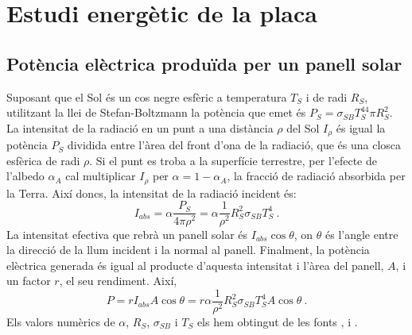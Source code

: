 \documentclass[11pt]{article}
\begin{document}
\section{Estudi energètic de la placa}
\subsection{Potència elèctrica produïda per un panell solar}
Suposant que el Sol és un cos negre esfèric a temperatura $T_S$ i de radi $R_S$, utilitzant la llei de Stefan-Boltzmann la potència que emet és $P_S=\sigma_{SB}T_S^44\pi R_S^2$. La intensitat de la radiació en un punt a una distància ${\rho}$ del Sol $I_{\rho}$ és igual la potència $P_S$ dividida entre l'àrea del front d'ona de la radiació, que és una closca esfèrica de radi ${\rho}$. Si el punt es troba a la superfície terrestre,  per l’efecte de l’albedo $\alpha_A$ cal multiplicar $I_{\rho}$ per $\alpha=1-\alpha_A$, la fracció de radiació absorbida per la Terra. Així doncs, la intensitat de la radiació incident és:
\begin{equation}
    I_{abs} = \alpha \frac{P_S}{4\pi \rho^2}=\alpha \frac{1}{\rho^2} R_S^2\sigma_{SB} T_S^4 \ .
    \label{I_abs}
\end{equation}
La intensitat efectiva que rebrà un panell solar és $I_{abs} \cos{\theta}$, on $\theta$ és l'angle entre la direcció de la llum incident i la normal al panell. Finalment, la potència elèctrica generada és igual al producte d'aquesta intensitat i l'àrea del panell, $A$, i un factor $r$, el seu rendiment. Així,
\begin{equation}
    P = r I_{abs} A \cos{\theta} = r \alpha \frac{1}{\rho^2}R_S^2\sigma_{SB}T_S^4A \cos{\theta} \ .
    \label{potencia placa}
\end{equation}
Els valors numèrics de $\alpha$, $R_S$, $\sigma_{SB}$ i $T_S$ els hem obtingut de les fonts \cite{Earth}, \cite{Sun} i \cite{Universe}.
\end{document}
